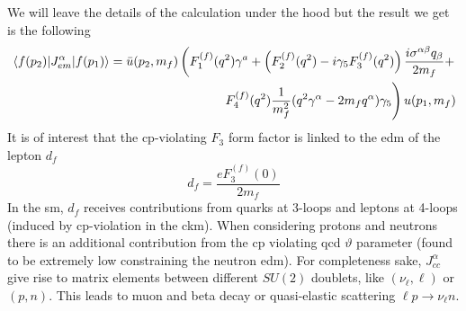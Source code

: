 \begin{refsection}
        We will leave the details of the calculation under the hood but the result we get is the following
        \begin{equation}
        \begin{split}
            \matrixel{f(p_2)}{J^\alpha_{em}}{f(p_1)} = 
            \bar{u}(p_2,m_f) \left(F^{(f)}_1(q^2)\gamma^a+ \left(F^{(f)}_2(q^2)- i\gamma_5F^{(f)}_3(q^2)\right) \frac{i\sigma^{\alpha\beta}q_\beta}{2m_f}+ \right.\\
            \left. F^{(f)}_4(q^2)\frac{1}{m_f^2}(q^2\gamma^\alpha-2m_fq^\alpha)\gamma_5 \right) u(p_1,m_f)
        \end{split}
        \end{equation}
        It is of interest that the \gls{cp}-violating $F_3$ form factor is linked to the \gls{edm} of the lepton $d_f$
        \begin{equation}
            d_f=\frac{eF_3^{(f)}(0)}{2m_f}
            \label{eq:edm}
        \end{equation}
        In the \gls{sm}, $d_f$ receives contributions from quarks at 3-loops and leptons at 4-loops (induced by \gls{cp}-violation in the \gls{ckm}). 
        When considering protons and neutrons there is an additional contribution from the \gls{cp} violating \gls{qcd} $\vartheta$ parameter (found to be extremely low constraining the neutron \gls{edm}).
        For completeness sake, $J_{cc}^\alpha$ give rise to matrix elements between different $SU(2)$ doublets, like $(\nu_\ell,\ell)$ or $(p,n)$. This leads to muon and beta decay or quasi-elastic scattering $\ell p\rightarrow \nu_\ell n$.


\end{refsection}
